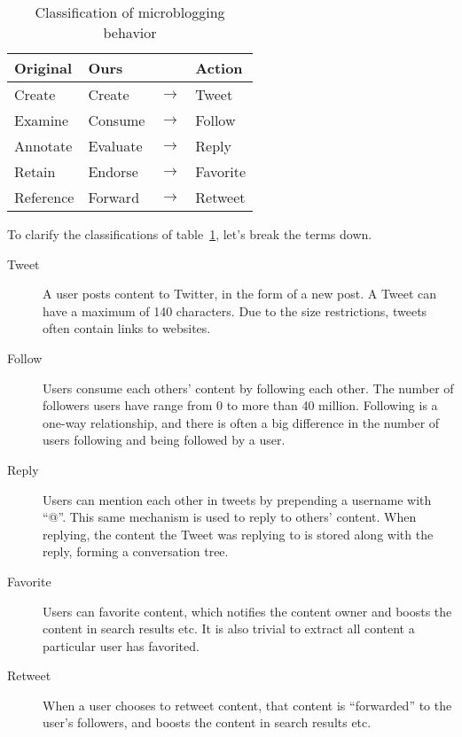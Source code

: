 \begin{table}[h]
  \begin{center}
    \begin{tabular}{|llcl|}
      \hline
      \textbf{Original} & \textbf{Ours} & & \textbf{Action} \\
      \hline
      Create    & Create   & $\rightarrow$ & Tweet \\
      \hline
      Examine   & Consume  & $\rightarrow$ & Follow \\
      \hline
      Annotate  & Evaluate & $\rightarrow$ & Reply \\
      \hline
      Retain    & Endorse  & $\rightarrow$ & Favorite \\
      \hline
      Reference & Forward  & $\rightarrow$ & Retweet \\
      \hline
    \end{tabular}
  \end{center}
  \caption{Classification of microblogging behavior}
  \label{tab:behavior_class}
\end{table}

To clarify the classifications of table~\ref{tab:behavior_class}, let's break the terms down.

\begin{description}
  \item[Tweet]
    A user posts content to Twitter, in the form of a new post.
    A Tweet can have a maximum of 140 characters.
    Due to the size restrictions, tweets often contain links to websites.
  \item[Follow]
    Users consume each others' content by following each other.
    The number of followers users have range from 0 to more than 40 million.
    Following is a one-way relationship, and there is often a big difference in the number of users following and being followed by a user.
  \item[Reply]
    Users can mention each other in tweets by prepending a username with ``@''.
    This same mechanism is used to reply to others' content.
    When replying, the content the Tweet was replying to is stored along with the reply, forming a conversation tree.
  \item[Favorite]
    Users can favorite content, which notifies the content owner and boosts the content in search results etc.
    It is also trivial to extract all content a particular user has favorited.
  \item[Retweet]
    When a user chooses to retweet content, that content is ``forwarded'' to the user's followers, and boosts the content in search results etc.
\end{description}


